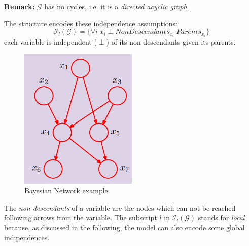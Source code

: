\textbf{Remark:} $\mathcal{G}$ has no cycles, i.e. it is a \textit{directed acyclic graph}.\newline

The structure encodes these independence assumptions:
\begin{equation}
    \mathcal{I}_l(\mathcal{G}) = \{\forall i \; x_i \perp \mathit{NonDescendants}_{x_i} | Parents_{x_i}\}
\end{equation}
each variable is independent ($\perp$) of its non-descendants given its parents.

\begin{figure}
    \centering
    \includegraphics[width=0.5\textwidth]{images/bayesianNetworkExample.png}
    \caption{Bayesian Network example.}
    \label{fig:bayesianNetworkExample}
\end{figure}
The \textit{non-descendants} of a variable are the nodes which can not be reached following arrows from the variable. The subscript $l$ in $\mathcal{I}_l (\mathcal{G})$ stands for \textit{local} because, as discussed in the following, the model can also encode some global indipendences. \newline

